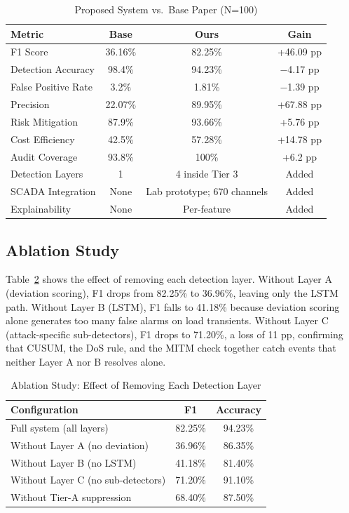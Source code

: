 \documentclass[conference,a4paper]{IEEEtran}
\begin{document}
\begin{table}[htbp]
\caption{Proposed System vs.\ Base Paper (N=100)}
\begin{center}
\begin{tabular}{|l|c|c|c|}
\hline
\textbf{Metric} & \textbf{Base} & \textbf{Ours} & \textbf{Gain} \\
\hline
F1 Score & 36.16\% & 82.25\% & +46.09 pp \\
\hline
Detection Accuracy & 98.4\% & 94.23\% & $-$4.17 pp \\
\hline
False Positive Rate & 3.2\% & 1.81\% & $-$1.39 pp \\
\hline
Precision & 22.07\% & 89.95\% & +67.88 pp \\
\hline
Risk Mitigation & 87.9\% & 93.66\% & +5.76 pp \\
\hline
Cost Efficiency & 42.5\% & 57.28\% & +14.78 pp \\
\hline
Audit Coverage & 93.8\% & 100\% & +6.2 pp \\
\hline
Detection Layers & 1 & 4 inside Tier 3 & Added \\
\hline
SCADA Integration & None & Lab prototype; 670 channels & Added \\
\hline
Explainability & None & Per-feature & Added \\
\hline
\end{tabular}
\label{tab:base}
\end{center}
\end{table}

\subsection{Ablation Study}

Table~\ref{tab:ablation} shows the effect of removing each detection layer. Without Layer A (deviation scoring), F1 drops from 82.25\% to 36.96\%, leaving only the LSTM path. Without Layer B (LSTM), F1 falls to 41.18\% because deviation scoring alone generates too many false alarms on load transients. Without Layer C (attack-specific sub-detectors), F1 drops to 71.20\%, a loss of 11 pp, confirming that CUSUM, the DoS rule, and the MITM check together catch events that neither Layer A nor B resolves alone.

\begin{table}[htbp]
\caption{Ablation Study: Effect of Removing Each Detection Layer}
\begin{center}
\begin{tabular}{|l|c|c|}
\hline
\textbf{Configuration} & \textbf{F1} & \textbf{Accuracy} \\
\hline
Full system (all layers) & 82.25\% & 94.23\% \\
\hline
Without Layer A (no deviation) & 36.96\% & 86.35\% \\
\hline
Without Layer B (no LSTM) & 41.18\% & 81.40\% \\
\hline
Without Layer C (no sub-detectors) & 71.20\% & 91.10\% \\
\hline
Without Tier-A suppression & 68.40\% & 87.50\% \\
\hline
\end{tabular}
\label{tab:ablation}
\end{center}
\end{table}
\end{document}
